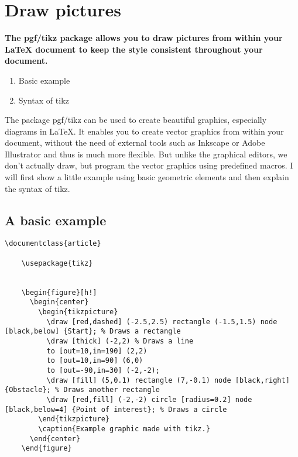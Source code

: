 
\maketitle
\newpage
\section{Draw pictures}
  \textbf{
    The pgf/tikz package allows you to draw pictures from within your LaTeX document to keep the style consistent throughout your document.
  }
  \begin{enumerate} %
    \item Basic example
    \item Syntax of tikz
  \end{enumerate} 
  The package pgf/tikz can be used to create beautiful graphics, especially diagrams in LaTeX. It enables you to create vector graphics from within your document, without the need of external tools such as Inkscape or Adobe Illustrator and thus is much more flexible. But unlike the graphical editors, we don't actually draw, but program the vector graphics using predefined macros. I will first show a little example using basic geometric elements and then explain the syntax of tikz.
  
  \subsection{A basic example}

  \begin{lstlisting}[language={[LaTeX]TeX},breaklines=true,frame=single]
    \documentclass{article}

    \usepackage{tikz}
    
    
    \begin{figure}[h!]
      \begin{center}
        \begin{tikzpicture}
          \draw [red,dashed] (-2.5,2.5) rectangle (-1.5,1.5) node [black,below] {Start}; % Draws a rectangle
          \draw [thick] (-2,2) % Draws a line
          to [out=10,in=190] (2,2)
          to [out=10,in=90] (6,0) 
          to [out=-90,in=30] (-2,-2);    
          \draw [fill] (5,0.1) rectangle (7,-0.1) node [black,right] {Obstacle}; % Draws another rectangle
          \draw [red,fill] (-2,-2) circle [radius=0.2] node [black,below=4] {Point of interest}; % Draws a circle
        \end{tikzpicture}
        \caption{Example graphic made with tikz.}
      \end{center}
    \end{figure}
    
  \end{lstlisting}
